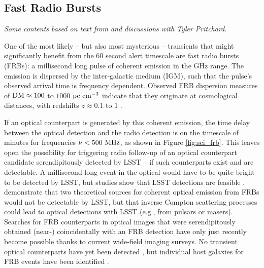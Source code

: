 \documentclass[DM,lsstdraft,authoryear,toc]{lsstdoc}
\begin{document}

\subsection{Fast Radio Bursts}\label{ssec:latency_frb}

{\it Some contents based on text from and discussions with Tyler Pritchard.}

One of the most likely -- but also most mysterious -- transients that might significantly benefit from the $60$ second alert timescale are fast radio bursts (FRBs): a millisecond long pulse of coherent emission in the GHz range.
The emission is dispersed by the inter-galactic medium (IGM), such that the pulse's observed arrival time is frequency dependent.
Observed FRB dispersion measures of $\rm{DM}\approx100$ to $1000$ $\rm pc\ cm^{-3}$ indicate that they originate at cosmological distances, with redshifts $z\approx0.1$ to $1$ \citep{2018Natur.562..386S}. 

If an optical counterpart is generated by this coherent emission, the time delay between the optical detection and the radio detection is on the timescale of minutes for frequencies $\nu < 500\ {\rm MHz}$, as shown in Figure \ref{fig:sci_frb}.
This leaves open the possibility for triggering radio follow-up of an optical counterpart candidate serendipitously detected by LSST -- if such counterparts exist and are detectable.
A millisecond-long event in the optical would have to be quite bright to be detected by LSST, but studies show that LSST detections are feasible \citep{2016ApJ...824L..18L}.
\cite{2019ApJ...878...89Y} demonstrate that two theoretical sources for coherent optical emission from FRBs would not be detectable by LSST, but that inverse Compton scattering processes could lead to optical detections with LSST (e.g., from pulsars or masers).
Searches for FRB counterparts in optical images that were serendipitously obtained (near-) coincidentally with an FRB detection have only just recently become possible thanks to current wide-field imaging surveys.
No transient optical counterparts have yet been detected \citep{2019ApJ...881...30T}, but individual host galaxies for FRB events have been identified \citep{2016Natur.530..453K}.
\end{document}
